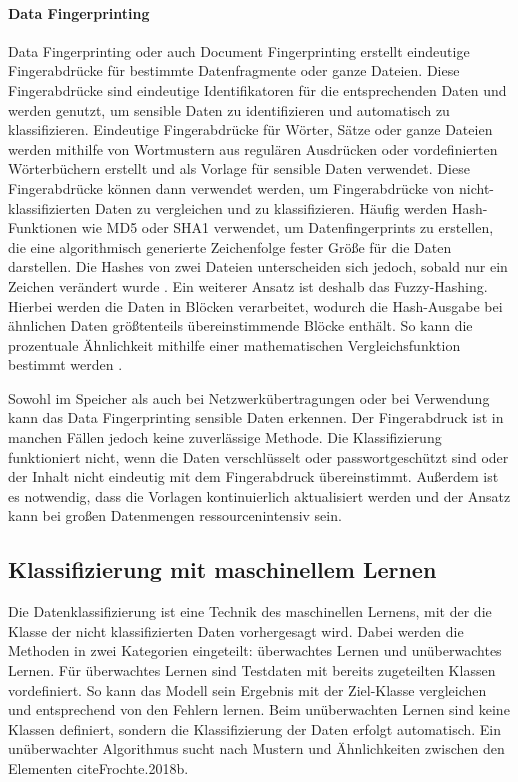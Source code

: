 \paragraph{Data Fingerprinting}
Data Fingerprinting oder auch Document Fingerprinting erstellt eindeutige Fingerabdrücke für bestimmte Datenfragmente oder ganze Dateien. Diese Fingerabdrücke sind eindeutige Identifikatoren für die entsprechenden Daten und werden genutzt, um sensible Daten zu identifizieren und automatisch zu klassifizieren. Eindeutige Fingerabdrücke für Wörter, Sätze oder ganze Dateien werden mithilfe von Wortmustern aus regulären Ausdrücken oder vordefinierten Wörterbüchern erstellt und als Vorlage für sensible Daten verwendet. Diese Fingerabdrücke können dann verwendet werden, um Fingerabdrücke von nicht-klassifizierten Daten zu vergleichen und zu klassifizieren.
Häufig werden Hash-Funktionen wie MD5 oder SHA1 verwendet, um Datenfingerprints zu erstellen, die eine algorithmisch generierte Zeichenfolge fester Größe für die Daten darstellen. Die Hashes von zwei Dateien unterscheiden sich jedoch, sobald nur ein Zeichen verändert wurde \cite{Alneyadi.2016}. Ein weiterer Ansatz ist deshalb das \glqq Fuzzy-Hashing\grqq. Hierbei werden die Daten in Blöcken verarbeitet, wodurch die Hash-Ausgabe bei ähnlichen Daten größtenteils übereinstimmende Blöcke enthält. So kann die prozentuale Ähnlichkeit mithilfe einer mathematischen Vergleichsfunktion bestimmt werden \cite{Shu.2015}.

Sowohl im Speicher als auch bei Netzwerkübertragungen oder bei Verwendung kann das Data Fingerprinting sensible Daten erkennen. Der Fingerabdruck ist in manchen Fällen jedoch keine zuverlässige Methode. Die Klassifizierung funktioniert nicht, wenn die Daten verschlüsselt oder passwortgeschützt sind oder der Inhalt nicht eindeutig mit dem Fingerabdruck übereinstimmt. Außerdem ist es notwendig, dass die Vorlagen kontinuierlich aktualisiert werden und der Ansatz kann bei großen Datenmengen ressourcenintensiv sein.


\subsection{Klassifizierung mit maschinellem Lernen}
Die Datenklassifizierung ist eine Technik des maschinellen Lernens, mit der die Klasse der nicht klassifizierten Daten vorhergesagt wird. Dabei werden die Methoden in zwei Kategorien eingeteilt: überwachtes Lernen und unüberwachtes Lernen. Für überwachtes Lernen sind Testdaten mit bereits zugeteilten Klassen vordefiniert. So kann das Modell sein Ergebnis mit der Ziel-Klasse vergleichen und entsprechend von den Fehlern lernen. Beim unüberwachten Lernen sind keine Klassen definiert, sondern die Klassifizierung der Daten erfolgt automatisch. Ein unüberwachter Algorithmus sucht nach Mustern und Ähnlichkeiten zwischen den Elementen cite{Frochte.2018b}.

